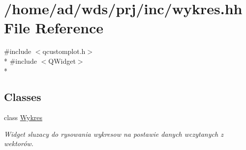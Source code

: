 \hypertarget{wykres_8hh}{}\section{/home/ad/wds/prj/inc/wykres.hh File Reference}
\label{wykres_8hh}
{\ttfamily \#include $<$qcustomplot.\+h$>$}\\*
{\ttfamily \#include $<$Q\+Widget$>$}\\*
\subsection*{Classes}
\begin{DoxyCompactItemize}
\item 
class \hyperlink{class_wykres}{Wykres}
\begin{DoxyCompactList}\small\item\em Widget sluzacy do rysowania wykresow na postawie danych wczytanych z wektorów. \end{DoxyCompactList}\end{DoxyCompactItemize}
